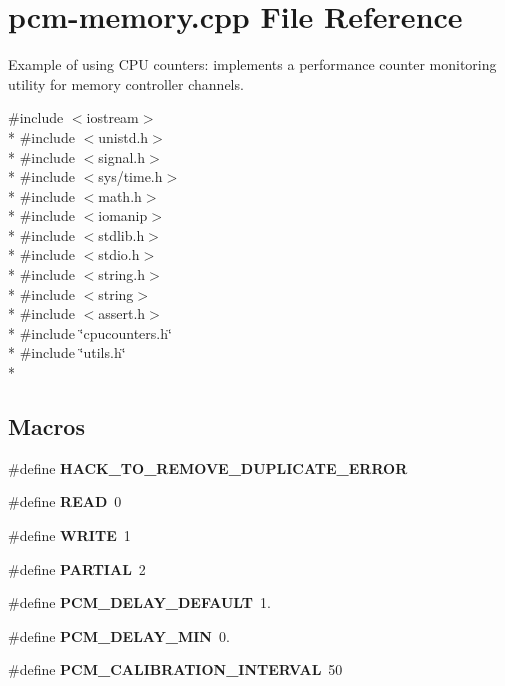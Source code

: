 \section{pcm-\/memory.cpp File Reference}
\label{pcm-memory_8cpp}


Example of using C\+P\+U counters\+: implements a performance counter monitoring utility for memory controller channels.  


{\ttfamily \#include $<$iostream$>$}\\*
{\ttfamily \#include $<$unistd.\+h$>$}\\*
{\ttfamily \#include $<$signal.\+h$>$}\\*
{\ttfamily \#include $<$sys/time.\+h$>$}\\*
{\ttfamily \#include $<$math.\+h$>$}\\*
{\ttfamily \#include $<$iomanip$>$}\\*
{\ttfamily \#include $<$stdlib.\+h$>$}\\*
{\ttfamily \#include $<$stdio.\+h$>$}\\*
{\ttfamily \#include $<$string.\+h$>$}\\*
{\ttfamily \#include $<$string$>$}\\*
{\ttfamily \#include $<$assert.\+h$>$}\\*
{\ttfamily \#include \char`\"{}cpucounters.\+h\char`\"{}}\\*
{\ttfamily \#include \char`\"{}utils.\+h\char`\"{}}\\*
\subsection*{Macros}
\begin{DoxyCompactItemize}
\item 
\#define {\bfseries H\+A\+C\+K\+\_\+\+T\+O\+\_\+\+R\+E\+M\+O\+V\+E\+\_\+\+D\+U\+P\+L\+I\+C\+A\+T\+E\+\_\+\+E\+R\+R\+O\+R}\label{pcm-memory_8cpp_ac4eeb11d89b0f517835a12a04443ebe4}

\item 
\#define {\bfseries R\+E\+A\+D}~0\label{pcm-memory_8cpp_ada74e7db007a68e763f20c17f2985356}

\item 
\#define {\bfseries W\+R\+I\+T\+E}~1\label{pcm-memory_8cpp_aa10f470e996d0f51210d24f442d25e1e}

\item 
\#define {\bfseries P\+A\+R\+T\+I\+A\+L}~2\label{pcm-memory_8cpp_abf4b6a83d9763fc6ae16c3e15dcf7a5b}

\item 
\#define {\bfseries P\+C\+M\+\_\+\+D\+E\+L\+A\+Y\+\_\+\+D\+E\+F\+A\+U\+L\+T}~1.\label{pcm-memory_8cpp_aa9ecc55c90c7a69729babc4f5f91ed96}

\item 
\#define {\bfseries P\+C\+M\+\_\+\+D\+E\+L\+A\+Y\+\_\+\+M\+I\+N}~0.\label{pcm-memory_8cpp_acccbe8441d6dd75bdc949f5f0ee126c5}

\item 
\#define {\bfseries P\+C\+M\+\_\+\+C\+A\+L\+I\+B\+R\+A\+T\+I\+O\+N\+\_\+\+I\+N\+T\+E\+R\+V\+A\+L}~50\label{pcm-memory_8cpp_a433dde946b6713059756318598c9a6fe}

\end{DoxyCompactItemize}
